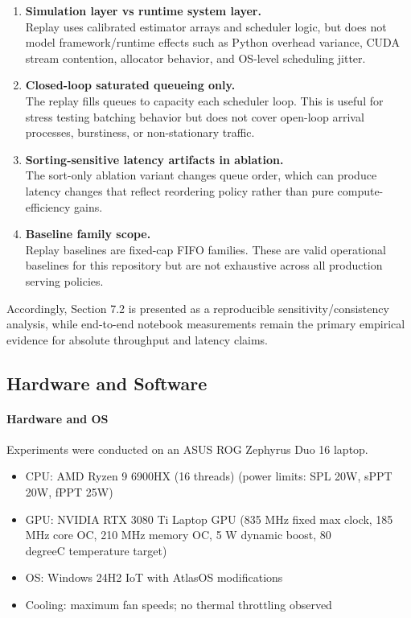 \documentclass{article}
\newcommand{\degree}{\ensuremath{^\circ}}
\providecommand{\tightlist}{\setlength{\itemsep}{0pt}\setlength{\parskip}{0pt}}
\begin{document}
\begin{enumerate}
\def\labelenumi{\arabic{enumi}.}
\item
  \textbf{Simulation layer vs runtime system layer.}\\
  Replay uses calibrated estimator arrays and scheduler logic, but does
  not model framework/runtime effects such as Python overhead variance,
  CUDA stream contention, allocator behavior, and OS-level scheduling
  jitter.
\item
  \textbf{Closed-loop saturated queueing only.}\\
  The replay fills queues to capacity each scheduler loop. This is
  useful for stress testing batching behavior but does not cover
  open-loop arrival processes, burstiness, or non-stationary traffic.
\item
  \textbf{Sorting-sensitive latency artifacts in ablation.}\\
  The sort-only ablation variant changes queue order, which can produce
  latency changes that reflect reordering policy rather than pure
  compute-efficiency gains.
\item
  \textbf{Baseline family scope.}\\
  Replay baselines are fixed-cap FIFO families. These are valid
  operational baselines for this repository but are not exhaustive
  across all production serving policies.
\end{enumerate}

Accordingly, Section 7.2 is presented as a reproducible
sensitivity/consistency analysis, while end-to-end notebook measurements
remain the primary empirical evidence for absolute throughput and
latency claims.

\hypertarget{73-hardware-and-software}{%
\subsection{Hardware and
Software}\label{73-hardware-and-software}}

\hypertarget{hardware-and-os}{%
\paragraph{Hardware and OS}\label{hardware-and-os}}

Experiments were conducted on an ASUS ROG Zephyrus Duo 16 laptop.

\begin{itemize}
\tightlist
\item
  CPU: AMD Ryzen 9 6900HX (16 threads) (power limits: SPL 20W, sPPT 20W,
  fPPT 25W)
\item
  GPU: NVIDIA RTX 3080 Ti Laptop GPU (835 MHz fixed max clock, 185 MHz
  core OC, 210 MHz memory OC, 5 W dynamic boost, 80\\degree{}C temperature
  target)
\item
  OS: Windows 24H2 IoT with AtlasOS modifications
\item
  Cooling: maximum fan speeds; no thermal throttling observed
\end{itemize}
\end{document}

